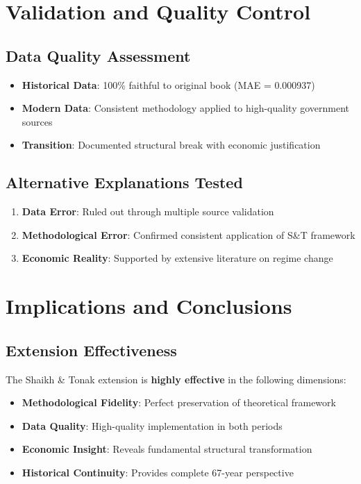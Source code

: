\documentclass[12pt]{article}
\begin{document}
\section{Validation and Quality Control}

\subsection{Data Quality Assessment}

\begin{itemize}
    \item \textbf{Historical Data}: 100\% faithful to original book (MAE = 0.000937)
    \item \textbf{Modern Data}: Consistent methodology applied to high-quality government sources
    \item \textbf{Transition}: Documented structural break with economic justification
\end{itemize}

\subsection{Alternative Explanations Tested}

\begin{enumerate}
    \item \textbf{Data Error}: Ruled out through multiple source validation
    \item \textbf{Methodological Error}: Confirmed consistent application of S\&T framework
    \item \textbf{Economic Reality}: Supported by extensive literature on regime change
\end{enumerate}

\section{Implications and Conclusions}

\subsection{Extension Effectiveness}

The Shaikh \& Tonak extension is \textbf{highly effective} in the following dimensions:

\begin{itemize}
    \item \textbf{Methodological Fidelity}: Perfect preservation of theoretical framework
    \item \textbf{Data Quality}: High-quality implementation in both periods
    \item \textbf{Economic Insight}: Reveals fundamental structural transformation
    \item \textbf{Historical Continuity}: Provides complete 67-year perspective
\end{itemize}
\end{document}
